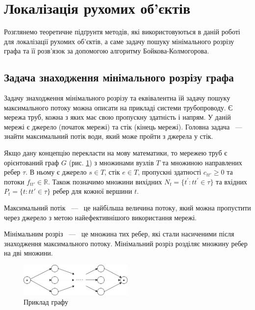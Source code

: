 \section{Локалізація рухомих об'єктів}

Розглянемо теоретичне підґрунтя методів, які використовуються в даній роботі для
локалізації рухомих об'єктів, а саме задачу пошуку мінімального розрізу графа
та її розв'язок за допомогою алгоритму Бойкова-Колмогорова.

\subsection{Задача знаходження мінімального розрізу графа}

Задачу знаходження мінімального розрізу та еквівалентна їй задачу пошуку максимального потоку
можна описати на прикладі системи трубопроводу.
Є мережа труб, кожна з яких має свою пропускну здатність і напрям.
У даній мережі є джерело (початок мережі) та стік (кінець мережі).
Головна задача ~---~ знайти максимальний потік води,
який може пройти з джерела у стік.

Якщо дану концепцію перекласти на мову
математики, то мережею труб є орієнтований граф $G$ (рис. \ref{fig:graph_example})
з множинами вузлів $T$ та множиною направлених ребер $\tau$.
В ньому є джерело $s \in T$, стік $e \in T$, пропускні здатності $c_{tt'} \ge 0$
та потоки $f_{tt'} \in \mathbb{R}$.
Також позначимо множини вихідних $N_t = \{t^{'}: tt^{'} \in \tau \}$
та вхідних $P_t = \{t: tt' \in \tau \}$ ребер для кожної вершини $t$.
\begin{definition}
    Максимальний потік ~---~  це найбільша величина потоку, який
    можна пропустити через джерело з метою найефективнішого  використання мережі.
\end{definition}

\begin{definition}
    Мінімальним розріз ~---~ це множина тих ребер, які стали насиченими після знаходження максимального
    потоку. Мінімальний розріз розділяє множину ребер на дві множини.
\end{definition}
\begin{figure}[H]
    \centering
    \includegraphics[width=0.5\textwidth]{images/graph_example}
    \caption{Приклад графу
        \label{fig:graph_example}
    }
\end{figure}

